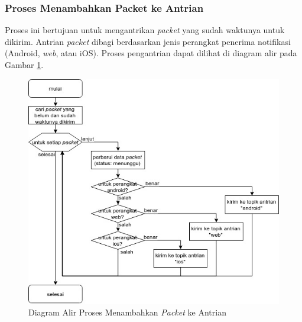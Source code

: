 \subsubsection{Proses Menambahkan Packet ke Antrian}
\label{3:proses_menambahkan_packet_ke_antrian}
\par Proses ini bertujuan untuk mengantrikan \textit{packet} yang sudah waktunya untuk dikirim.
Antrian \textit{packet} dibagi berdasarkan jenis perangkat penerima notifikasi (Android, \textit{web}, atau iOS). Proses pengantrian dapat dilihat di diagram alir pada Gambar \ref{flowchart_menambahkan_packet_ke_antrian}.
\begin{figure}[H]
	\centering\includegraphics[width=1\textwidth]{bab3/img/flowchart-menambahkan_packet_ke_antrian.jpg}
	\caption{Diagram Alir Proses Menambahkan \textit{Packet} ke Antrian} \label{flowchart_menambahkan_packet_ke_antrian}
\end{figure}

\clearpage
